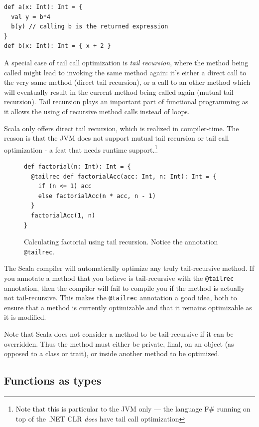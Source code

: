 \begin{lstlisting}
def a(x: Int): Int = { 
  val y = b*4
  b(y) // calling b is the returned expression 
} 
def b(x: Int): Int = { x + 2 }
\end{lstlisting} 

A special case of tail call optimization is \emph{tail recursion}, where the method being called might lead to invoking the same method again: it's either a direct call to the very same method (direct tail recursion), or a call to an other method which will eventually result in the current method being called again (mutual tail recursion). Tail recursion plays an important part of functional programming as it allows the using of recursive method calls instead of loops.

Scala only offers direct tail recursion, which is realized in compiler-time. The reason is that the JVM does not support mutual tail recursion or tail call optimization - a feat that needs runtime support.\footnote{Note that this is particular to the JVM only --- the language F\# running on top of the .NET CLR \emph{does} have tail call optimization}

\begin{figure}[h!] 
\begin{lstlisting}
def factorial(n: Int): Int = {
  @tailrec def factorialAcc(acc: Int, n: Int): Int = {
    if (n <= 1) acc
    else factorialAcc(n * acc, n - 1)
  }
  factorialAcc(1, n)
}
\end{lstlisting}
\caption{Calculating factorial using tail recursion. Notice the annotation \texttt{@tailrec}.}
\label{fig:example_scala_tailrec}
\end{figure}

The Scala compiler will automatically optimize any truly tail-recursive method. If you annotate a method that you believe is tail-recursive with the \texttt{@tailrec} annotation, then the compiler will fail to compile you if the method is actually not tail-recursive. This makes the \texttt{@tailrec} annotation a good idea, both to ensure that a method is currently optimizable and that it remains optimizable as it is modified.

Note that Scala does not consider a method to be tail-recursive if it can be overridden. Thus the method must either be private, final, on an object (as opposed to a class or trait), or inside another method to be optimized.

\subsection{Functions as types}
